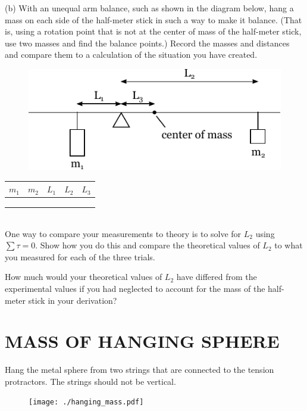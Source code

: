 \documentclass[11pt,letterpaper]{article}
\begin{document}
\clearpage
(b) With an unequal arm balance, such as shown in the diagram below, hang
a mass on each side of the half-meter stick in such a way to make it
balance.  (That is, using a rotation point that is not at the center
of mass of the half-meter stick, use two masses and find the balance
points.)  Record the masses and distances and compare them to a
calculation of the situation you have created.

\begin{figure}[h]
\begin{center}
\includegraphics{./lab6_part2b.pdf}
\end{center}
\end{figure}

\begin{tabularx}{\linewidth}{|Y|Y|Y|Y|Y|}
\hline
$m_1$ & $m_2$ & $L_1$ & $L_2$ & $L_3$\\
\hline &&&&\\
\hline &&&&\\
\hline &&&&\\
\hline
\end{tabularx}\\

One way to compare your measurements to theory is to solve for $L_2$ using $\sum\tau=0$. Show how you do this and compare the theoretical values of $L_2$ to what you measured for each of the three trials.
\vspace{7cm}

How much would your theoretical values of $L_2$ have differed from the experimental values if you had neglected to account for the mass of the half-meter stick in your derivation?

\section{MASS OF HANGING SPHERE}
Hang the metal sphere from two strings that are connected to the tension protractors. The strings should not be vertical.
\begin{figure}[h]
  \begin{center}
    \texttt{[image: ./hanging\_mass.pdf]}
  \end{center}
\end{figure}
\end{document}
